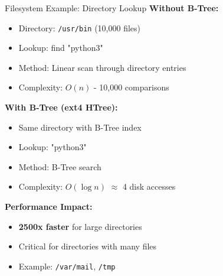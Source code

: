 \documentclass[aspectratio=169]{beamer}
\begin{document}
\begin{frame}{Filesystem Example: Directory Lookup}
  \textbf{Without B-Tree:}
  \begin{itemize}
    \item Directory: \texttt{/usr/bin} (10,000 files)
    \item Lookup: find "python3"
    \item Method: Linear scan through directory entries
    \item Complexity: $O(n)$ - 10,000 comparisons
  \end{itemize}

  \vspace{0.3cm}
  \textbf{With B-Tree (ext4 HTree):}
  \begin{itemize}
    \item Same directory with B-Tree index
    \item Lookup: "python3"
    \item Method: B-Tree search
    \item Complexity: $O(\log n)$ $\approx$ 4 disk accesses
  \end{itemize}

  \vspace{0.3cm}
  \textbf{Performance Impact:}
  \begin{itemize}
    \item \textbf{2500x faster} for large directories
    \item Critical for directories with many files
    \item Example: \texttt{/var/mail}, \texttt{/tmp}
  \end{itemize}
\end{frame}
\end{document}
